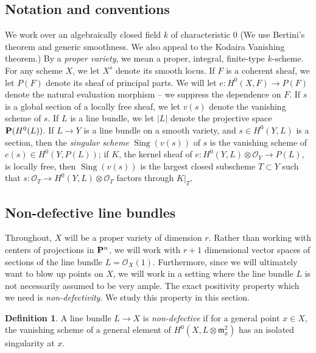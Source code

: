 \documentclass[11pt,reqno]{amsart}
\theoremstyle{plain}
\theoremstyle{definition}
\newtheorem{definition}[theorem]{Definition}
\theoremstyle{remark}
\numberwithin{equation}{section}
\DeclareMathOperator{\sing}{Sing}
\newcommand{\cO}{{\mathcal O}}
\renewcommand{\to}{{\longrightarrow}}
\numberwithin{equation}{section}
\begin{document}
\subsection{Notation and conventions} We work over an algebraically closed field
$k$ of characteristic $0$ (We use Bertini's theorem and generic smoothness. We
also appeal to the Kodaira Vanishing theorem.) By a {\sl proper variety}, we mean a proper, integral, finite-type $k$-scheme. For any scheme $X$, we let $X^{s}$ denote its smooth locus. If $F$ is a coherent sheaf, we let $P(F)$ denote its sheaf of principal parts. We will let $e: H^{0}(X,F) \to P(F)$ denote the natural evaluation morphism -- we suppress the dependence on $F$. If $s$ is a global section of a locally free sheaf, we let $v(s)$ denote the vanishing scheme of $s$.  If $L$ is a line bundle, we let $|L|$ denote the projective space $\P(H^{0}(L))$.  If $L \to Y$ is a line bundle on a smooth variety, and $s \in H^{0}(Y,L)$ is a section, then the {\sl singular scheme} $\sing(v(s))$ of $s$ is the vanishing scheme of $e(s) \in H^{0}(Y,P(L))$; if $K$, the kernel sheaf of $e : H^{0}(Y,L) \otimes \cO_{Y} \to P(L)$, is locally free, then $\sing(v(s))$ is the largest closed subscheme $T \subset Y$  such that $s: \cO_{T} \to H^{0}(Y,L) \otimes \cO_{T}$ factors through $K|_{T}$.  



 
\subsection{Non-defective line bundles} %


 Throughout, $X$ will be a proper variety of dimension $r$.  Rather than working with centers of projections in $\P^{n}$, we will work with $r+1$ dimensional vector spaces of sections of the line bundle $L = \cO_{X}(1)$.   Furthermore, since we will ultimately want to blow up points on $X$, we will work in a setting where the line bundle $L$ is not necessarily assumed to be very ample.  The exact positivity property which we need is {\sl non-defectivity}. We study this property in this section. 


\begin{definition}
  \label{definition:Genericallynon-defective} 
  A line bundle $L \to X$ is {\sl non-defective} if for a general point $x \in X$, the vanishing scheme of a  general element of $H^{0}(X, L \otimes {\mathfrak m}^{2}_{x} )$ has an isolated singularity at $x$.
\end{definition} 
\end{document}
